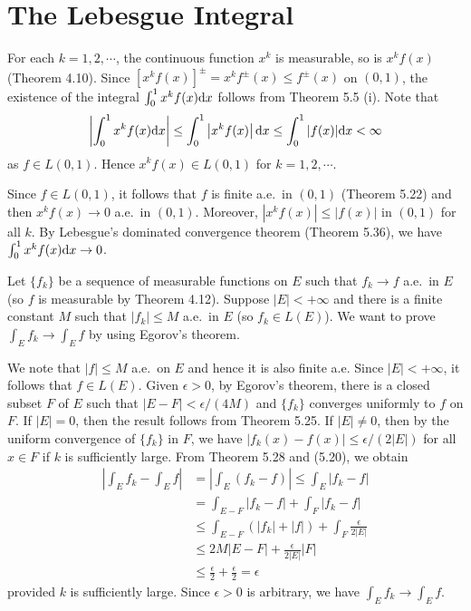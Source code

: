 \section{The Lebesgue Integral}

\begin{exercise}{5.4}
  For each $k=1,2,\cdots$, the continuous function $x^k$ is measurable,
  so is $x^kf(x)$ (Theorem 4.10).
  Since $[x^kf(x)]^\pm=x^kf^\pm(x)\leq f^\pm(x)$ on $(0,1)$,
  the existence of the integral $\int_0^1x^kf(x)\mathrm{d} x$ follows from Theorem 5.5 (i).
  Note that
  \[\left|\int_0^1 x^kf(x)\mathrm{d} x\right|\leq\int_0^1\left|x^kf(x)\right|\mathrm{d} x\leq\int_0^1|f(x)|\mathrm{d} x<\infty\]
  as $f\in L(0,1)$.
  Hence $x^kf(x)\in L(0,1)$ for $k=1,2,\cdots$.

  Since $f\in L(0,1)$, it follows that $f$ is finite a.e.\ in $(0,1)$ (Theorem 5.22)
  and then $x^kf(x)\to 0$ a.e.\ in $(0,1)$.
  Moreover, $|x^kf(x)|\leq |f(x)|$ in $(0,1)$ for all $k$.
  By Lebesgue's dominated convergence theorem (Theorem 5.36),
  we have $\int_0^1x^kf(x)\mathrm{d} x\to0$.
\end{exercise}

\begin{exercise}{5.5}
  Let $\{f_k\}$ be a sequence of measurable functions on $E$ such that
  $f_k\to f$ a.e.\ in $E$ (so $f$ is measurable by Theorem 4.12).
  Suppose $|E|<+\infty$ and there is a finite constant $M$
  such that $|f_k|\leq M$ a.e.\ in $E$ (so $f_k\in L(E)$).
  We want to prove $\int_Ef_k\to \int_E f$ by using Egorov's theorem.

  We note that $|f|\leq M$ a.e.\ on $E$ and hence it is also finite a.e.
  Since $|E|<+\infty$, it follows that $f\in L(E)$.
  Given $\epsilon>0$, by Egorov's theorem,
  there is a closed subset $F$ of $E$ such that
  $|E-F|<\epsilon/(4M)$ and $\{f_k\}$ converges uniformly to $f$ on $F$.
  If $|E|=0$, then the result follows from Theorem 5.25.
  If $|E|\neq 0$, then by the uniform convergence of $\{f_k\}$ in $F$,
  we have $|f_k(x)-f(x)|\leq \epsilon/(2|E|)$ for all $x\in F$ if $k$ is sufficiently large.
  From Theorem 5.28 and (5.20), we obtain
  \begin{equation*}
    \begin{aligned}
      \left|\int_E f_k-\int_Ef\right|&=	\left|\int_E (f_k-f)\right|\leq \int_E|f_k-f|\\&=\int_{E-F}|f_k-f|+\int_F|f_k-f|\\&\leq\int_{E-F}(|f_k|+|f|)+\int_F\frac{\epsilon}{2|E|}\\
      &\leq 2M|E-F|+\frac{\epsilon}{2|E|}|F|\\&\leq\frac{\epsilon}{2}+\frac{\epsilon}{2}=\epsilon
    \end{aligned}
  \end{equation*}
  provided $k$ is sufficiently large.
  Since $\epsilon>0$ is arbitrary, we have $\int_Ef_k\to \int_E f$.
\end{exercise}

